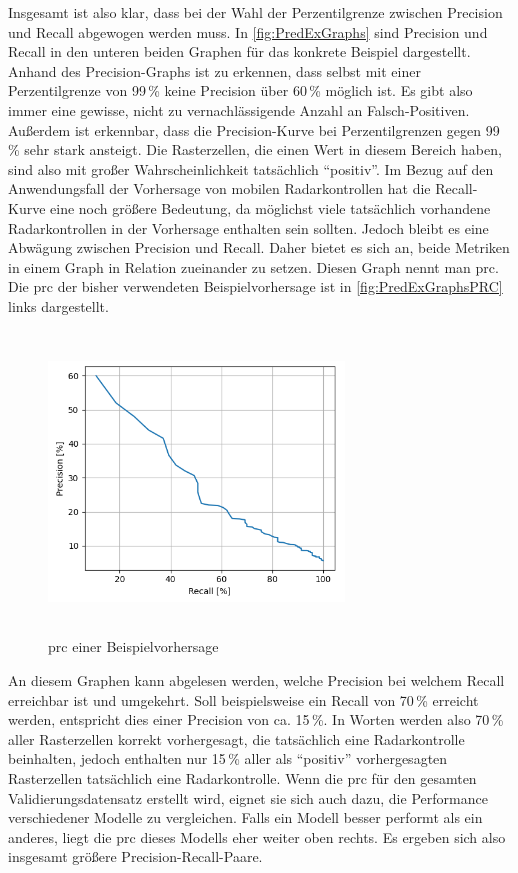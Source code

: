Insgesamt ist also klar, dass bei der Wahl der Perzentilgrenze zwischen Precision und Recall abgewogen werden muss.
In \autoref{fig:PredExGraphs} sind Precision und Recall in den unteren beiden Graphen für das konkrete Beispiel dargestellt.
Anhand des Precision-Graphs ist zu erkennen, dass selbst mit einer Perzentilgrenze von 99\,\% keine Precision über 60\,\% möglich ist.
Es gibt also immer eine gewisse, nicht zu vernachlässigende Anzahl an Falsch-Positiven.
Außerdem ist erkennbar, dass die Precision-Kurve bei Perzentilgrenzen gegen 99\,\% sehr stark ansteigt.
Die Rasterzellen, die einen Wert in diesem Bereich haben, sind also mit großer Wahrscheinlichkeit tatsächlich "`positiv"'.
Im Bezug auf den Anwendungsfall der Vorhersage von mobilen Radarkontrollen hat die Recall-Kurve eine noch größere Bedeutung, da möglichst viele tatsächlich vorhandene Radarkontrollen in der Vorhersage enthalten sein sollten.
Jedoch bleibt es eine Abwägung zwischen Precision und Recall.
Daher bietet es sich an, beide Metriken in einem Graph in Relation zueinander zu setzen.
Diesen Graph nennt man \acrfull{prc}.
Die \acrshort{prc} der bisher verwendeten Beispielvorhersage ist in \autoref{fig:PredExGraphsPRC} links dargestellt.

\begin{figure}[h]
    \centering
    \includegraphics[width=0.7\textwidth,height=8cm,keepaspectratio=true]{content/images/PredExGraphsPRC.png}
    \caption{\acrfull{prc} einer Beispielvorhersage}
    \label{fig:PredExGraphsPRC}
\end{figure}

An diesem Graphen kann abgelesen werden, welche Precision bei welchem Recall erreichbar ist und umgekehrt.
Soll beispielsweise ein Recall von 70\,\% erreicht werden, entspricht dies einer Precision von ca. 15\,\%.
In Worten werden also 70\,\% aller Rasterzellen korrekt vorhergesagt, die tatsächlich eine Radarkontrolle beinhalten, jedoch enthalten nur 15\,\% aller als "`positiv"' vorhergesagten Rasterzellen tatsächlich eine Radarkontrolle.
Wenn die \acrshort{prc} für den gesamten Validierungsdatensatz erstellt wird, eignet sie sich auch dazu, die Performance verschiedener Modelle zu vergleichen.
Falls ein Modell besser performt als ein anderes, liegt die \acrshort{prc} dieses Modells eher weiter oben rechts.
Es ergeben sich also insgesamt größere Precision-Recall-Paare.


